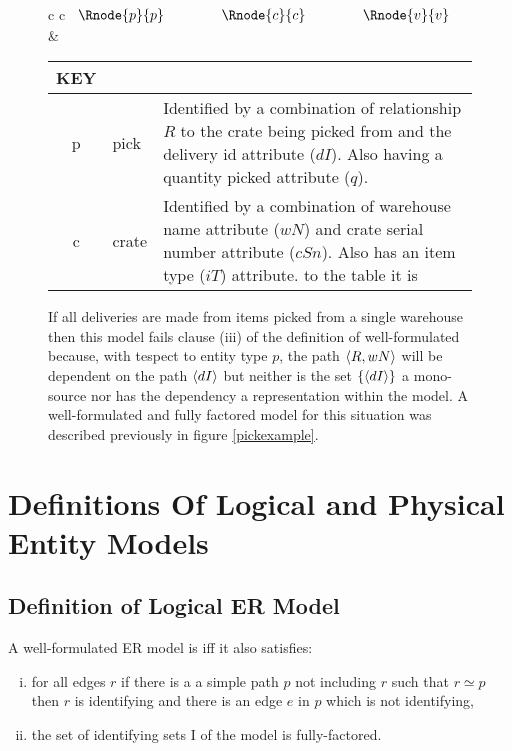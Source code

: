 \begin{figure} [h]
\begin{center}
\begin{tabular}{c c}
$
\begin{array}{cp{0.75cm}cp{0.75cm}c}
   \Rnode{p}{p}     & & \Rnode{c}{c} & & \Rnode{v}{v}    
\end{array}
$
\idcomp
{} 
\idcomp
{} 
\idcomp
{}
\idcomp
{}
& \footnotesize
\begin{tabular}{c p{1.5cm} p{4cm}}
KEY && \\
\hline
p & pick & Identified by a combination of relationship $R$ to the crate being picked from
                and the delivery id attribute ($dI$). Also  having a quantity picked 
								attribute ($q$).\\
c & crate & Identified by a combination of warehouse name attribute ($wN$)
              and crate serial number attribute ($cSn$). Also has an item type ($iT$) attribute.
 to the table it is 
\end{tabular} 
\end{tabular}
\end{center}
\caption{If all deliveries are made from items picked from a single warehouse 
then this model fails clause (iii) of the definition of well-formulated because, with tespect to entity type $p$, the path $\langle R,wN\rangle$ will be dependent on the path $\langle dI\rangle$ but neither is the set 
$\{\langle dI\rangle\}$ a mono-source nor has the dependency a representation within the model. A well-formulated and fully factored model for this situation was described previously in 
figure \ref{pickexample}.
}
\label{pickexamplebeforenormalisation}
\end{figure}
\section{Definitions Of Logical and Physical Entity Models}

	
\subsection{Definition of Logical ER Model}

\begin{definition}
A well-formulated ER model is   iff it 
also satisfies:
\begin{enumerate}[(i)]
\item
for all edges $r$ if there is a
a simple path $p$  not including $r$ such that
 $r \simeq p$  then $r$ is identifying and there is an edge $e$ in $p$ which is not identifying,
\item the set of identifying sets I of the model is fully-factored.
\end{enumerate} 
\end{definition}

